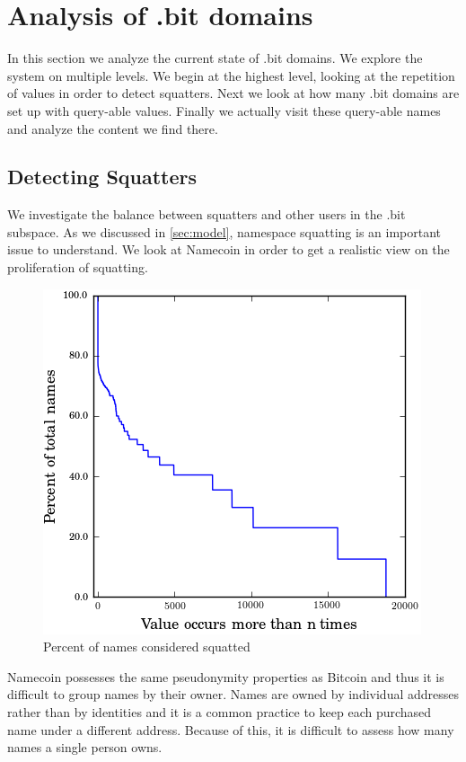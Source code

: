 \section{Analysis of .bit domains}

In this section we analyze the current state of .bit domains. We explore the system on multiple levels. We begin at the highest level, looking at the repetition of values in order to detect squatters. Next we look at how many .bit domains are set up with query-able values. Finally we actually visit these query-able names and analyze the content we find there.

\subsection{Detecting Squatters}

We investigate the balance between squatters and other users in the .bit subspace. As we discussed in \ref{sec:model}, namespace squatting is an important issue to understand. We look at Namecoin in order to get a realistic view on the proliferation of squatting.

\begin{figure}
  \centering
  \includegraphics[width=0.9\columnwidth]{figures/squatters}
  \caption{Percent of names considered squatted}
  \label{fig:percentSquatter}
\end{figure}

Namecoin possesses the same pseudonymity properties as Bitcoin and thus it is difficult to group names by their owner. Names are owned by individual addresses rather than by identities and it is a common practice to keep each purchased name under a different address. Because of this, it is difficult to assess how many names a single person owns. 

